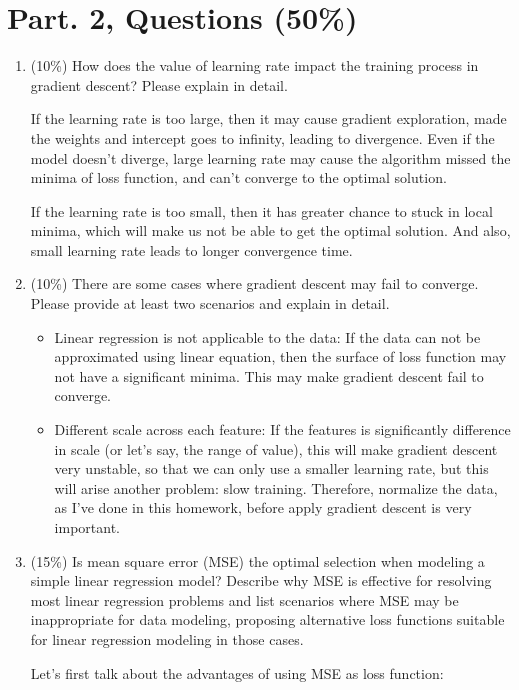 \documentclass[twocolumn]{extarticle}
\begin{document}
\section{Part. 2, Questions (50\%)}
\begin{enumerate}
\item (10\%) How does the value of learning rate impact the training process in gradient descent? Please explain in detail.

If the learning rate is too large, then it may cause gradient exploration, made the weights and intercept goes to infinity, leading to divergence. Even if the model doesn't diverge, large learning rate may cause the algorithm missed the minima of loss function, and can't converge to the optimal solution.

If the learning rate is too small, then it has greater chance to stuck in local minima, which will make us not be able to get the optimal solution. And also, small learning rate leads to longer convergence time.

\item (10\%) There are some cases where gradient descent may fail to converge. Please provide at least two scenarios and explain in detail.

\begin{itemize}
\item Linear regression is not applicable to the data: If the data can not be approximated using linear equation, then the surface of loss function may not have a significant minima. This may make gradient descent fail to converge.
\item Different scale across each feature: If the features is significantly difference in scale (or let's say, the range of value), this will make gradient descent very unstable, so that we can only use a smaller learning rate, but this will arise another problem: slow training. Therefore, normalize the data, as I've done in this homework, before apply gradient descent is very important.
\end{itemize}


\item (15\%) Is mean square error (MSE) the optimal selection when modeling a simple linear regression model? Describe why MSE is effective for resolving most linear regression problems and list scenarios where MSE may be inappropriate for data modeling, proposing alternative loss functions suitable for linear regression modeling in those cases.

Let's first talk about the advantages of using MSE as loss function:


\end{enumerate}
\end{document}
